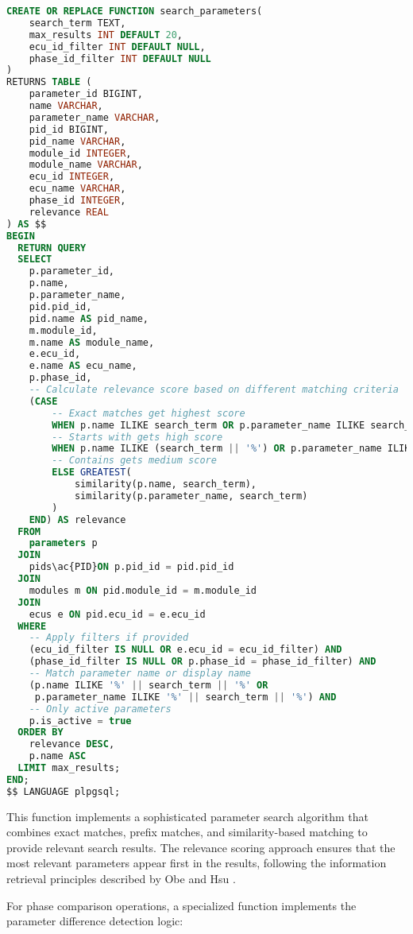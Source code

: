 \begin{lstlisting}[language=SQL, caption={Parameter Search Function}, label={lst:parameter-search}]
CREATE OR REPLACE FUNCTION search_parameters(
    search_term TEXT,
    max_results INT DEFAULT 20,
    ecu_id_filter INT DEFAULT NULL,
    phase_id_filter INT DEFAULT NULL
)
RETURNS TABLE (
    parameter_id BIGINT,
    name VARCHAR,
    parameter_name VARCHAR, 
    pid_id BIGINT,
    pid_name VARCHAR,
    module_id INTEGER,
    module_name VARCHAR,
    ecu_id INTEGER,
    ecu_name VARCHAR,
    phase_id INTEGER,
    relevance REAL
) AS $$
BEGIN
  RETURN QUERY
  SELECT 
    p.parameter_id,
    p.name,
    p.parameter_name,
    pid.pid_id,
    pid.name AS pid_name,
    m.module_id,
    m.name AS module_name,
    e.ecu_id,
    e.name AS ecu_name,
    p.phase_id,
    -- Calculate relevance score based on different matching criteria
    (CASE 
        -- Exact matches get highest score
        WHEN p.name ILIKE search_term OR p.parameter_name ILIKE search_term THEN 1.0
        -- Starts with gets high score
        WHEN p.name ILIKE (search_term || '%') OR p.parameter_name ILIKE (search_term || '%') THEN 0.8
        -- Contains gets medium score
        ELSE GREATEST(
            similarity(p.name, search_term),
            similarity(p.parameter_name, search_term)
        )
    END) AS relevance
  FROM 
    parameters p
  JOIN 
    pids\ac{PID}ON p.pid_id = pid.pid_id
  JOIN 
    modules m ON pid.module_id = m.module_id
  JOIN 
    ecus e ON pid.ecu_id = e.ecu_id
  WHERE 
    -- Apply filters if provided
    (ecu_id_filter IS NULL OR e.ecu_id = ecu_id_filter) AND
    (phase_id_filter IS NULL OR p.phase_id = phase_id_filter) AND
    -- Match parameter name or display name
    (p.name ILIKE '%' || search_term || '%' OR 
     p.parameter_name ILIKE '%' || search_term || '%') AND
    -- Only active parameters
    p.is_active = true
  ORDER BY 
    relevance DESC, 
    p.name ASC
  LIMIT max_results;
END;
$$ LANGUAGE plpgsql;
\end{lstlisting}

This function implements a sophisticated parameter search algorithm that combines exact matches, prefix matches, and similarity-based matching to provide relevant search results. The relevance scoring approach ensures that the most relevant parameters appear first in the results, following the information retrieval principles described by Obe and Hsu \cite{obe2017postgresql}.

For phase comparison operations, a specialized function implements the parameter difference detection logic:

